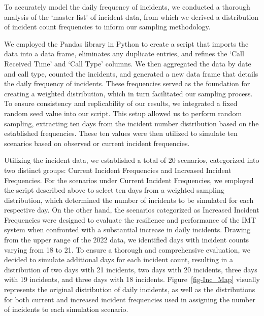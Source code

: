 \documentclass[fancy, oneside, mastersfancy, ms]{byuthesis}
\begin{document}
To accurately model the daily frequency of incidents, we conducted a
thorough analysis of the `master list' of incident data, from which we
derived a distribution of incident count frequencies to inform our
sampling methodology.

We employed the Pandas library in Python to create a script that imports
the data into a data frame, eliminates any duplicate entries, and
refines the `Call Received Time' and `Call Type' columns. We then
aggregated the data by date and call type, counted the incidents, and
generated a new data frame that details the daily frequency of
incidents. These frequencies served as the foundation for creating a
weighted distribution, which in turn facilitated our sampling process.
To ensure consistency and replicability of our results, we integrated a
fixed random seed value into our script. This setup allowed us to
perform random sampling, extracting ten days from the incident number
distribution based on the established frequencies. These ten values were
then utilized to simulate ten scenarios based on observed or current
incident frequencies.

Utilizing the incident data, we established a total of 20 scenarios,
categorized into two distinct groups: Current Incident Frequencies and
Increased Incident Frequencies. For the scenarios under Current Incident
Frequencies, we employed the script described above to select ten days
from a weighted sampling distribution, which determined the number of
incidents to be simulated for each respective day. On the other hand,
the scenarios categorized as Increased Incident Frequencies were
designed to evaluate the resilience and performance of the IMT system
when confronted with a substantial increase in daily incidents. Drawing
from the upper range of the 2022 data, we identified days with incident
counts varying from 18 to 21. To ensure a thorough and comprehensive
evaluation, we decided to simulate additional days for each incident
count, resulting in a distribution of two days with 21 incidents, two
days with 20 incidents, three days with 19 incidents, and three days
with 18 incidents. Figure~\ref{fig-Inc_Map} visually represents the
original distribution of daily incidents, as well as the distributions
for both current and increased incident frequencies used in assigning
the number of incidents to each simulation scenario.
\end{document}
